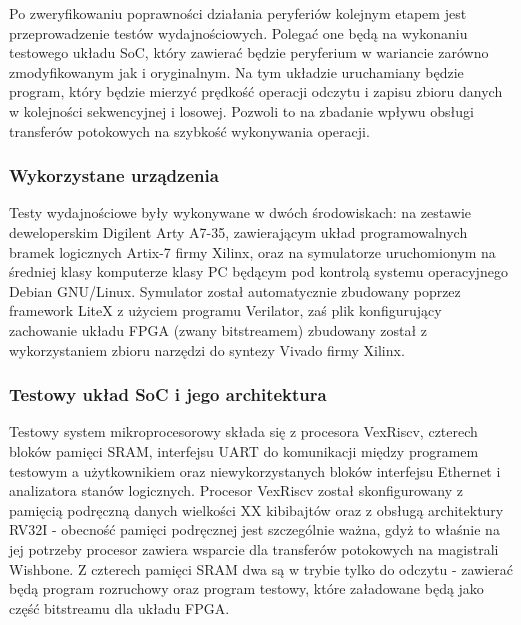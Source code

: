 Po zweryfikowaniu poprawności działania peryferiów kolejnym etapem jest przeprowadzenie testów wydajnościowych. Polegać one będą na wykonaniu testowego układu SoC, który zawierać będzie peryferium w wariancie zarówno zmodyfikowanym jak i oryginalnym. Na tym układzie uruchamiany będzie program, który będzie mierzyć prędkość operacji odczytu i zapisu zbioru danych w kolejności sekwencyjnej i losowej. Pozwoli to na zbadanie wpływu obsługi transferów potokowych na szybkość wykonywania operacji.

\subsubsection{Wykorzystane urządzenia}

Testy wydajnościowe były wykonywane w dwóch środowiskach: na zestawie deweloperskim Digilent Arty A7-35, zawierającym układ programowalnych bramek logicznych Artix-7 firmy Xilinx, oraz na symulatorze uruchomionym na średniej klasy komputerze klasy PC będącym pod kontrolą systemu operacyjnego Debian GNU/Linux. Symulator został automatycznie zbudowany poprzez framework LiteX z użyciem programu Verilator, zaś plik konfigurujący zachowanie układu FPGA (zwany bitstreamem) zbudowany został z wykorzystaniem zbioru narzędzi do syntezy Vivado firmy Xilinx.


\subsubsection{Testowy układ SoC i jego architektura}

Testowy system mikroprocesorowy składa się z procesora VexRiscv, czterech bloków pamięci SRAM, interfejsu UART do komunikacji między programem testowym a użytkownikiem oraz niewykorzystanych bloków interfejsu Ethernet i analizatora stanów logicznych.
Procesor VexRiscv został skonfigurowany z pamięcią podręczną danych wielkości XX kibibajtów oraz z obsługą architektury RV32I - obecność pamięci podręcznej jest szczególnie ważna, gdyż to właśnie na jej potrzeby procesor zawiera wsparcie dla transferów potokowych na magistrali Wishbone.
Z czterech pamięci SRAM dwa są w trybie tylko do odczytu - zawierać będą program rozruchowy oraz program testowy, które załadowane będą jako część bitstreamu dla układu FPGA.


